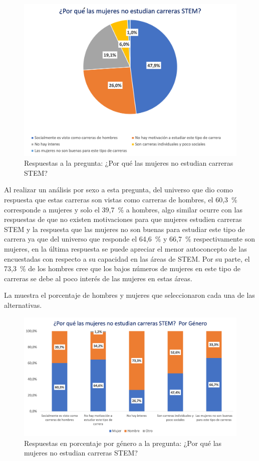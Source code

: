 \documentclass[spanish]{textolivre}
\begin{document}
\begin{figure}[h!]
\includegraphics[scale=0.7]{images/figura1.png}
\caption{Respuestas a la pregunta: ¿Por qué las mujeres no estudian carreras STEM?}
\label{fig:1} 
\end{figure}

Al realizar un análisis por sexo a esta pregunta, del universo que dio como respuesta que estas carreras son vistas como carreras de hombres, el 60,3~\% corresponde a mujeres y solo el 39,7~\% a hombres, algo similar ocurre con las respuestas de que no existen motivaciones para que mujeres estudien carreras STEM y la respuesta que las mujeres no son buenas para estudiar este tipo de carrera ya que del universo que responde el 64,6~\% y 66,7~\% respectivamente son mujeres, en la última respuesta se puede apreciar el menor autoconcepto de las encuestadas con respecto a su capacidad en las áreas de STEM.
Por su parte, el 73,3~\% de los hombres cree que los bajos números de mujeres en este tipo de carreras se debe al poco interés de las mujeres en estas áreas.

La  muestra el porcentaje de hombres y mujeres que seleccionaron cada una de las alternativas.

\begin{figure}[h!]
\includegraphics[scale=0.6]{images/figura2.png}
\caption{Respuestas en porcentaje por género a la pregunta: ¿Por qué las mujeres no estudian carreras STEM? }
\label{fig:2}
\end{figure}
\end{document}
